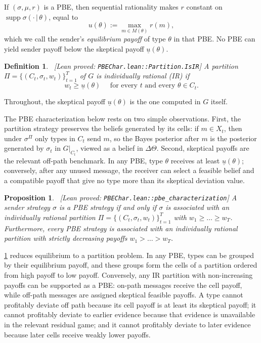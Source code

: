 \documentclass[11pt]{article}
\newtheorem{proposition}{Proposition}
\newtheorem{definition}{Definition}
\newcommand{\sep}{\,|\,}
\newcommand{\supp}{\operatorname{supp}}
\newcommand{\leanproved}[1]{{\footnotesize\textsf{\textcolor{green!55!black}{[Lean proved: \texttt{#1}]}}}}
\begin{document}
If $(\sigma,\mu,r)$ is a PBE, then sequential rationality makes $r$ constant on $\supp \sigma(\cdot \sep \theta)$, equal to
\[
    u(\theta) := \max_{m \in M(\theta)} r(m),
\]
which we call the sender's \emph{equilibrium payoff} of type $\theta$ in that PBE. No PBE can yield sender payoff below the skeptical payoff $\underline{u}(\theta)$.

\begin{definition}\label{dfn:IR}\ \leanproved{PBEChar.lean::Partition.IsIR}
    A partition $\Pi = \{ (C_t,\sigma_t,w_t) \}_{t=1}^T$ of $G$ is \emph{individually rational (IR)} if
    \begin{equation}\label{eqn:IR}
        w_t \geq \underline{u}(\theta) \quad \text{ for every } t \text{ and every } \theta \in C_t. \tag{IR}
    \end{equation}
\end{definition}
Throughout, the skeptical payoff $\underline{u}(\theta)$ is the one computed in $G$ itself.

The PBE characterization below rests on two simple observations.
First, the partition strategy preserves the beliefs generated by its cells: if $m\in X_t$, then under $\sigma^\Pi$ only types in $C_t$ send $m$, so the Bayes posterior after $m$ is the posterior generated by $\sigma_t$ in $G\vert_{C_t}$, viewed as a belief in $\Delta\Theta$. Second, skeptical payoffs are the relevant off-path benchmark.
In any PBE, type $\theta$ receives at least $\underline u(\theta)$; conversely, after any unused message, the receiver can select a feasible belief and a compatible payoff that give no type more than its skeptical deviation value.
\begin{proposition}\label{prop:pbe-characterization}\ \leanproved{PBEChar.lean::pbe\_characterization}
    A sender strategy $\sigma$ is a PBE strategy if and only if $\sigma$ is associated with an individually rational partition $\Pi = \{ (C_t,\sigma_t,w_t) \}_{t=1}^T$ with $w_1 \geq \ldots \geq w_T$.
    Furthermore, every PBE strategy is associated with an individually rational partition with strictly decreasing payoffs $w_1 > \ldots > w_T$.
\end{proposition}

\cref{prop:pbe-characterization} reduces equilibrium to a partition problem. In any PBE, types can be grouped by their equilibrium payoff, and these groups form the cells of a partition ordered from high payoff to low payoff. Conversely, any IR partition with non-increasing payoffs can be supported as a PBE: on-path messages receive the cell payoff, while off-path messages are assigned skeptical feasible payoffs. A type cannot profitably deviate off path because its cell payoff is at least its skeptical payoff; it cannot profitably deviate to earlier evidence because that evidence is unavailable in the relevant residual game; and it cannot profitably deviate to later evidence because later cells receive weakly lower payoffs.
\end{document}
